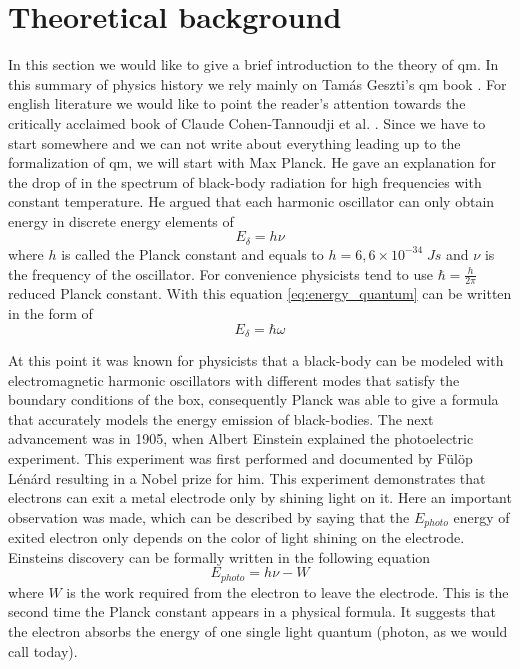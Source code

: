 \section{Theoretical background}
\label{sec:theory}

In this section we would like to give a brief introduction to the theory of \acrshort{qm}. In this summary of physics history we rely mainly on Tamás Geszti's \acrshort{qm} book \cite{geszti2007}.
For english literature we would like to point the reader's attention towards the critically acclaimed book of Claude Cohen-Tannoudji et al. \cite{tannoudjiVol1}.
Since we have to start somewhere and we can not write about everything leading up to the formalization of \acrshort{qm}, we will start with Max Planck.
He gave an explanation for the drop of in the spectrum of black-body radiation for high frequencies with constant temperature.
He argued that each harmonic oscillator can only obtain energy in discrete energy elements of
\begin{equation}
	\label{eq:energy_quantum}
	E_\delta = h\nu
\end{equation}
where $h$ is called the Planck constant and equals to $h = 6,6 \times 10^{-34}\;Js$
and $\nu$ is the frequency of the oscillator.
For convenience physicists tend to use $\hbar = \frac{h}{2\pi}$ reduced Planck constant.
With this equation \ref{eq:energy_quantum} can be written in the form of
\begin{equation}
	E_\delta = \hbar\omega
\end{equation}

At this point it was known for physicists that a black-body can be modeled with electromagnetic harmonic oscillators with different modes that satisfy the boundary conditions of the box, consequently Planck was able to give a formula that accurately models the energy emission of black-bodies.
The next advancement was in 1905, when Albert Einstein explained the photoelectric experiment.
This experiment was first performed and documented by Fülöp Lénárd resulting in a Nobel prize for him.
This experiment demonstrates that electrons can exit a metal electrode only by shining light on it.
Here an important observation was made, which can be described by saying that the $E_{photo}$ energy of exited electron only depends on the color of light shining on the electrode.
Einsteins discovery can be formally written in the following equation
\begin{equation}
	E_{photo} = h\nu - W
\end{equation}
where $W$ is the work required from the electron to leave the electrode.
This is the second time the Planck constant appears in a physical formula.
It suggests that the electron absorbs the energy of one single light quantum (photon, as we would call today).

